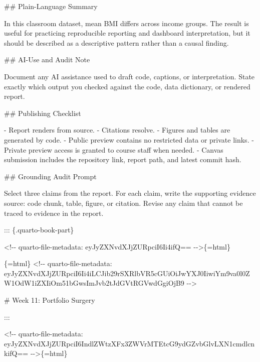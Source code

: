 \documentclass[
  letterpaper,
  DIV=11,
  numbers=noendperiod,
  oneside]{scrreprt}
\newenvironment{Shaded}{\begin{snugshade}}{\end{snugshade}}
\newcommand{\FunctionTok}[1]{\textcolor[rgb]{0.28,0.35,0.67}{#1}}
\newcommand{\InformationTok}[1]{\textcolor[rgb]{0.37,0.37,0.37}{#1}}
\newcommand{\NormalTok}[1]{\textcolor[rgb]{0.00,0.23,0.31}{#1}}
\newcommand{\SpecialStringTok}[1]{\textcolor[rgb]{0.13,0.47,0.30}{#1}}
\begin{document}
\begin{Shaded}
\begin{Highlighting}[numbers=left,,]
\FunctionTok{\#\# Plain{-}Language Summary}

\NormalTok{In this classroom dataset, mean BMI differs across income groups. The result is useful for practicing reproducible reporting and dashboard interpretation, but it should be described as a descriptive pattern rather than a causal finding.}

\FunctionTok{\#\# AI{-}Use and Audit Note}

\NormalTok{Document any AI assistance used to draft code, captions, or interpretation. State exactly which output you checked against the code, data dictionary, or rendered report.}

\FunctionTok{\#\# Publishing Checklist}

\SpecialStringTok{{-} }\NormalTok{Report renders from source.}
\SpecialStringTok{{-} }\NormalTok{Citations resolve.}
\SpecialStringTok{{-} }\NormalTok{Figures and tables are generated by code.}
\SpecialStringTok{{-} }\NormalTok{Public preview contains no restricted data or private links.}
\SpecialStringTok{{-} }\NormalTok{Private preview access is granted to course staff when needed.}
\SpecialStringTok{{-} }\NormalTok{Canvas submission includes the repository link, report path, and latest commit hash.}

\FunctionTok{\#\# Grounding Audit Prompt}

\NormalTok{Select three claims from the report. For each claim, write the supporting evidence source: code chunk, table, figure, or citation. Revise any claim that cannot be traced to evidence in the report.}


\NormalTok{::: \{.quarto{-}book{-}part\}}


\InformationTok{\textasciigrave{}\textless{}!{-}{-} quarto{-}file{-}metadata: eyJyZXNvdXJjZURpciI6Ii4ifQ== {-}{-}\textgreater{}\textasciigrave{}}\NormalTok{\{=html\}}

\InformationTok{\textasciigrave{}\textasciigrave{}\textasciigrave{}\{=html\}}
\InformationTok{\textless{}!{-}{-} quarto{-}file{-}metadata: eyJyZXNvdXJjZURpciI6Ii4iLCJib29rSXRlbVR5cGUiOiJwYXJ0IiwiYm9va0l0ZW1OdW1iZXIiOm51bGwsImJvb2tJdGVtRGVwdGgiOjB9 {-}{-}\textgreater{}}
\InformationTok{\textasciigrave{}\textasciigrave{}\textasciigrave{}}

\FunctionTok{\# Week 11: Portfolio Surgery}


\NormalTok{:::}



\InformationTok{\textasciigrave{}\textless{}!{-}{-} quarto{-}file{-}metadata: eyJyZXNvdXJjZURpciI6IndlZWtzXFx3ZWVrMTEtcG9ydGZvbGlvLXN1cmdlcnkifQ== {-}{-}\textgreater{}\textasciigrave{}}\NormalTok{\{=html\}}


\end{Highlighting}
\end{Shaded}
\end{document}
